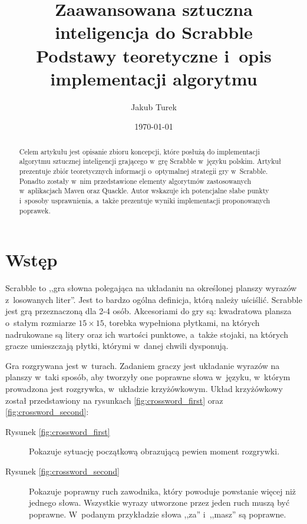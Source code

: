 \documentclass[a4paper,twocolumn,12pt]{article}
\title{\LARGE{Zaawansowana sztuczna inteligencja do Scrabble} \\ \vspace{2mm} \large{Podstawy teoretyczne i~opis implementacji algorytmu}}
\author{Jakub Turek}
\date{\today}
\theoremstyle{definition}
\begin{document}
\maketitle

\begin{abstract}
Celem artykułu jest opisanie zbioru koncepcji, które posłużą do implementacji algorytmu sztucznej inteligencji grającego w~grę Scrabble w~języku polskim. Artykuł prezentuje zbiór teoretycznych informacji o~optymalnej strategii gry w~Scrabble. Ponadto zostały w~nim przedstawione elementy algorytmów zastosowanych w~aplikacjach Maven oraz Quackle. Autor wskazuje ich potencjalne słabe punkty i~sposoby usprawnienia, a~także prezentuje wyniki implementacji proponowanych poprawek.
\end{abstract}

\section*{Wstęp}

Scrabble to ,,gra słowna polegająca na układaniu na określonej planszy wyrazów z~losowanych liter''. \cite{scrabble_definition} Jest to bardzo ogólna definicja, którą należy uściślić. Scrabble jest grą przeznaczoną dla 2-4 osób. Akcesoriami do gry są: kwadratowa plansza o~stałym rozmiarze $15 \times 15$, torebka wypełniona płytkami, na których nadrukowane są litery oraz ich wartości punktowe, a~także stojaki, na których gracze umieszczają płytki, którymi w~danej chwili dysponują.

Gra rozgrywana jest w~turach. Zadaniem graczy jest układanie wyrazów na planszy w~taki sposób, aby tworzyły one poprawne słowa w~języku, w~którym prowadzona jest rozgrywka, w~układzie krzyżówkowym. Układ krzyżówkowy został przedstawiony na rysunkach \ref{fig:crossword_first} oraz \ref{fig:crossword_second}:

\begin{description}
 \item [Rysunek \ref{fig:crossword_first}] Pokazuje sytuację początkową obrazującą pewien moment rozgrywki.
 \item [Rysunek \ref{fig:crossword_second}] Pokazuje poprawny ruch zawodnika, który powoduje powstanie więcej niż jednego słowa. Wszystkie wyrazy utworzone przez jeden ruch muszą być poprawne. W~podanym przykładzie słowa ,,za'' i~,,masz'' są poprawne.
\end{description}
\end{document}
